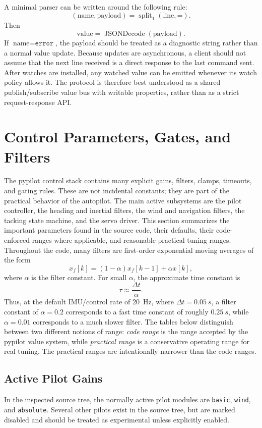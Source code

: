 \documentclass[10pt,twocolumn]{article}
\begin{document}
A minimal parser can be written around the following rule:
\[
(\text{name},\text{payload})
=
\operatorname{split}_{1}(\text{line},\texttt{=}).
\]
Then
\[
\text{value} = \operatorname{JSONDecode}(\text{payload}).
\]
If \(\text{name}=\texttt{error}\), the payload should be treated as a
diagnostic string rather than a normal value update.
Because updates are asynchronous, a client should not assume that the next
line received is a direct response to the last command sent.  After watches
are installed, any watched value can be emitted whenever its watch policy
allows it.  The protocol is therefore best understood as a shared
publish/subscribe value bus with writable properties, rather than as a
strict request-response API.

\section{Control Parameters, Gates, and Filters}
\label{sec:pypilot-parameters}
The pypilot control stack contains many explicit gains, filters, clamps,
timeouts, and gating rules.  These are not incidental constants; they are
part of the practical behavior of the autopilot.  The main active
subsystems are the pilot controller, the heading and inertial filters, the
wind and navigation filters, the tacking state machine, and the servo
driver.  This section summarizes the important parameters found in the
source code, their defaults, their code-enforced ranges where applicable,
and reasonable practical tuning ranges.
Throughout the code, many filters are first-order exponential moving
averages of the form
\[
x_f[k]
=
(1-\alpha)x_f[k-1] + \alpha x[k],
\]
where \(\alpha\) is the filter constant.  For small \(\alpha\), the
approximate time constant is
\[
\tau \approx \frac{\Delta t}{\alpha}.
\]
Thus, at the default IMU/control rate of \SI{20}{Hz}, where
\(\Delta t = \SI{0.05}{s}\), a filter constant of \(\alpha=0.2\)
corresponds to a fast time constant of roughly \(\SI{0.25}{s}\), while
\(\alpha=0.01\) corresponds to a much slower filter.
The tables below distinguish between two different notions of range:
\emph{code range} is the range accepted by the pypilot value system, while
\emph{practical range} is a conservative operating range for real tuning.
The practical ranges are intentionally narrower than the code ranges.
\subsection{Active Pilot Gains}
In the inspected source tree, the normally active pilot modules are
\texttt{basic}, \texttt{wind}, and \texttt{absolute}.  Several other
pilots exist in the source tree, but are marked disabled and should be
treated as experimental unless explicitly enabled.
\end{document}
